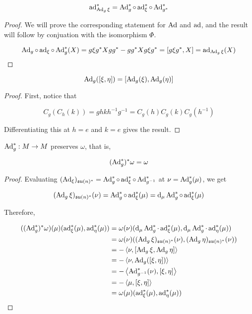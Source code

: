 \documentclass{article}
\newcommand{\su}{\mathfrak{su}}
\begin{document}
\begin{lemma}
    \[\operatorname{ad}_{\operatorname{Ad}_g\xi}^* = \operatorname{Ad}_g^* \circ \operatorname{ad}_\xi^* \circ \operatorname{Ad}_{g^*}^*\]
\end{lemma}

\begin{proof}
    We will prove the corresponding statement for \(\operatorname{Ad}\) and \(\operatorname{ad}\), and the result will follow by conjuation with the isomorphism \(\Phi\).

    \[\operatorname{Ad}_g \circ \operatorname{ad}_\xi \circ \operatorname{Ad}_g^*(X)= g\xi g^* X g g^* - g g^* X g \xi g^* = [g\xi g^*, X] = \operatorname{ad}_{\operatorname{Ad}_g\xi}(X)\]
\end{proof}

\begin{lemma}
    \[\operatorname{Ad}_g([\xi, \eta]) = [\operatorname{Ad}_g(\xi), \operatorname{Ad}_g(\eta)]\]
\end{lemma}

\begin{proof}
    First, notice that

    \[C_g(C_h(k)) = ghkh^{-1}g^{-1}= C_g(h)C_g(k)C_g(h^{-1})\]

    Differentiating this at \(h = e\) and \(k = e\) gives the result.
\end{proof}

\begin{lemma}
    \(\operatorname{Ad}_g^* :  M \to  M\) preserves \(\omega\), that is,

    \[(\operatorname{Ad}_g^*)^*\omega = \omega\]
\end{lemma}

\begin{proof}
    Evaluating \((\Ad_\xi)_{\su(n)^*} = \Ad_g^* \circ \ad_\xi^* \circ \Ad_{g^{-1}}^*\) at \(\nu = \operatorname{Ad}_g^*(\mu)\), we get

    \[(\Ad_g\xi)_{\su(n)^*}(\nu) = \Ad_g^* \circ \ad_\xi^*(\mu) = \dd_\mu\Ad_g^* \circ \ad_\xi^*(\mu)\]

    Therefore,

    \begin{align*}
        ((\Ad_g^*)^*\omega)(\mu)(\ad_\xi^*(\mu), \ad_\eta^*(\mu)) &= \omega(\nu)(\dd_\mu \Ad_g^* \cdot \ad_\xi^*(\mu), \dd_\mu \Ad_g^* \cdot \ad_\eta^*(\mu)) \\
        &= \omega(\nu)((\Ad_g\xi)_{\su(n)^*}(\nu), (\Ad_g\eta)_{\su(n)^*}(\nu)) \\
        &= -\inner{\nu, [\Ad_g\xi, \Ad_g\eta]} \\
        &= -\inner{\nu, \Ad_g([\xi, \eta])} \\
        &= -\inner{\Ad_{g^{-1}}^*(\nu), [\xi, \eta]} \\
        &= -\inner{\mu, [\xi, \eta]} \\
        &= \omega(\mu)(\ad_\xi^*(\mu), \ad_\eta^*(\mu))
    \end{align*}
\end{proof}
\end{document}
